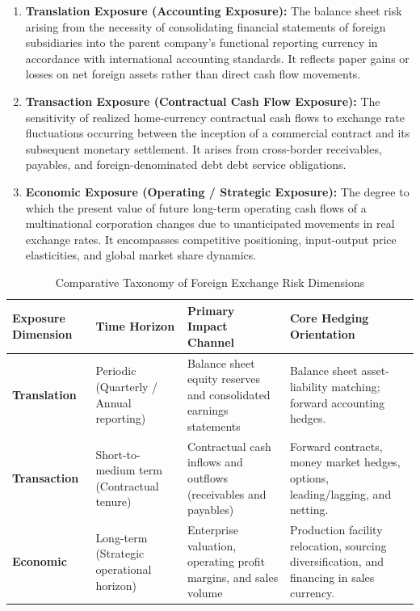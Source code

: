 \begin{enumerate}[leftmargin=1.8em, label=\textbf{\arabic*.}]
    \item \textbf{Translation Exposure (Accounting Exposure):} The balance sheet risk arising from the necessity of consolidating financial statements of foreign subsidiaries into the parent company's functional reporting currency in accordance with international accounting standards. It reflects paper gains or losses on net foreign assets rather than direct cash flow movements.
    \item \textbf{Transaction Exposure (Contractual Cash Flow Exposure):} The sensitivity of realized home-currency contractual cash flows to exchange rate fluctuations occurring between the inception of a commercial contract and its subsequent monetary settlement. It arises from cross-border receivables, payables, and foreign-denominated debt debt service obligations.
    \item \textbf{Economic Exposure (Operating / Strategic Exposure):} The degree to which the present value of future long-term operating cash flows of a multinational corporation changes due to unanticipated movements in real exchange rates. It encompasses competitive positioning, input-output price elasticities, and global market share dynamics.
\end{enumerate}

\vspace{0.3em}

\begin{table}[htbp]
\centering
\small
\renewcommand{\arraystretch}{1.25}
\setlength{\tabcolsep}{6pt}
\begin{tabularx}{\textwidth}{l p{3.0cm} p{4.2cm} X}
\toprule
\textbf{Exposure Dimension} & \textbf{Time Horizon} & \textbf{Primary Impact Channel} & \textbf{Core Hedging Orientation} \\
\midrule
\textbf{Translation} & Periodic (Quarterly / Annual reporting) & Balance sheet equity reserves and consolidated earnings statements & Balance sheet asset-liability matching; forward accounting hedges. \\
\textbf{Transaction} & Short-to-medium term (Contractual tenure) & Contractual cash inflows and outflows (receivables and payables) & Forward contracts, money market hedges, options, leading/lagging, and netting. \\
\textbf{Economic} & Long-term (Strategic operational horizon) & Enterprise valuation, operating profit margins, and sales volume & Production facility relocation, sourcing diversification, and financing in sales currency. \\
\bottomrule
\end{tabularx}
\caption{Comparative Taxonomy of Foreign Exchange Risk Dimensions}
\label{tab:fx_exposure_comparison}
\end{table}

